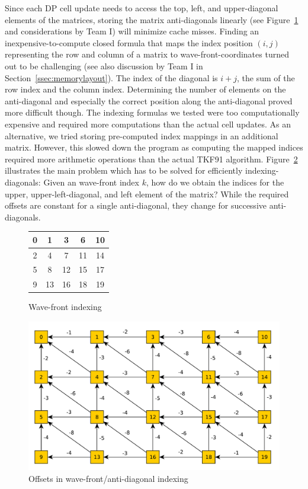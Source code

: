 \documentclass[runningheads,a4paper]{llncs}
\begin{document}
Since each DP cell update needs to access the top, left, and upper-diagonal elements of the matrices,
storing the matrix anti-diagonals linearly (see Figure~\ref{fig:wavefront} and considerations by Team I)
will minimize cache misses.
Finding an inexpensive-to-compute closed formula that maps the index position $(i,j)$ representing the row and column of a matrix
to wave-front-coordinates turned out to be challenging (see also discussion by Team I in Section~\ref{ssec:memorylayout}).
The index of the diagonal is $i+j$, the sum of the row index and the column index.
Determining the number of elements on the anti-diagonal and especially the correct position along the anti-diagonal proved more difficult though.
The indexing formulas we tested were too computationally expensive and required more computations than the actual cell updates.
As an alternative, we tried storing pre-computed index mappings in an additional matrix.
However, this slowed down the program as computing the mapped indices required more arithmetic operations than the actual TKF91 algorithm.
Figure~\ref{fig:offset} illustrates the main problem which has to be solved
for efficiently indexing-diagonals: Given an wave-front index $k$, how do we obtain the indices for the upper, upper-left-diagonal, and left element of the matrix?
While the required offsets are constant for a single anti-diagonal, they change for successive anti-diagonals.



\begin{figure}
\begin{minipage}{0.5\textwidth}
\centering
\begin{tabular}{|c|c|c|c|c|}
\hline
0 & 1 & 3 & 6 & 10 \\
\hline
2 & 4 & 7 & 11 & 14 \\
\hline
5 & 8 & 12 & 15 & 17 \\
\hline
9 & 13 & 16 & 18 & 19 \\
\hline
\end{tabular}
\caption{Wave-front indexing}
\label{fig:wavefront}
\end{minipage}
\end{figure}

\begin{figure}
\centering
\includegraphics[scale=0.5]{images/unnamed0.pdf}
\caption{Offsets in wave-front/anti-diagonal indexing}
\label{fig:offset}
\end{figure}
\end{document}

